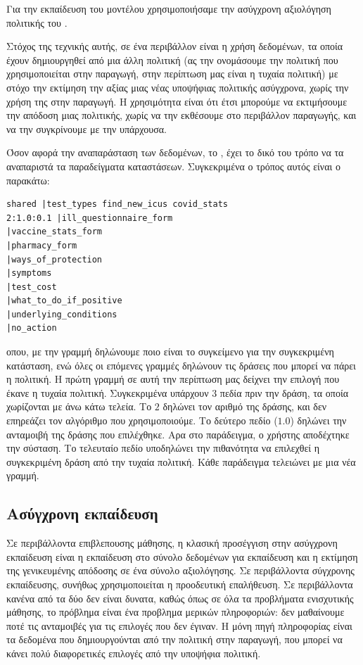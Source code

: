 Για την εκπαίδευση του μοντέλου χρησιμοποιήσαμε την ασύγχρονη αξιολόγηση πολιτικής  του .

Στόχος της τεχνικής αυτής, σε ένα περιβάλλον  είναι η χρήση δεδομένων, τα οποία έχουν δημιουργηθεί από μια άλλη πολιτική (ας την ονομάσουμε την πολιτική που χρησιμοποιείται στην παραγωγή, στην περίπτωση μας είναι η τυχαία πολιτική) με στόχο την εκτίμηση την αξίας μιας νέας υποψήφιας πολιτικής ασύγχρονα, χωρίς την χρήση της στην παραγωγή. Η χρησιμότητα είναι ότι έτσι μπορούμε να εκτιμήσουμε την απόδοση μιας πολιτικής, χωρίς να την εκθέσουμε στο περιβάλλον παραγωγής, και να την συγκρίνουμε με την υπάρχουσα.

Όσον αφορά την αναπαράσταση των δεδομένων, το , έχει το δικό του τρόπο να τα αναπαριστά τα παραδείγματα καταστάσεων. Συγκεκριμένα ο τρόπος αυτός είναι ο παρακάτω:

\begin{otherlanguage}{english}
    \begin{lstlisting}[caption=Μορφή εισόδου \en{Vowpal Wabbit}]
shared |test_types find_new_icus covid_stats
2:1.0:0.1 |ill_questionnaire_form
|vaccine_stats_form
|pharmacy_form
|ways_of_protection
|symptoms
|test_cost
|what_to_do_if_positive
|underlying_conditions
|no_action
    \end{lstlisting}
\end{otherlanguage}

οπου, με την γραμμή  δηλώνουμε ποιο είναι το συγκείμενο για την συγκεκριμένη κατάσταση, ενώ όλες οι επόμενες γραμμές δηλώνουν τις δράσεις που μπορεί να πάρει η πολιτική. Η πρώτη γραμμή σε αυτή την περίπτωση μας δείχνει την επιλογή που έκανε η τυχαία πολιτική. Συγκεκριμένα υπάρχουν 3 πεδία πριν την δράση, τα οποία χωρίζονται με άνω κάτω τελεία. Το $2$ δηλώνει τον αριθμό της δράσης, και δεν επηρεάζει τον αλγόριθμο που χρησιμοποιούμε. Το δεύτερο πεδίο ($1.0$) δηλώνει την ανταμοιβή της δράσης που επιλέχθηκε. Αρα στο παράδειγμα, ο χρήστης αποδέχτηκε την σύσταση. Το τελευταίο πεδίο υποδηλώνει την πιθανότητα να επιλεχθεί η συγκεκριμένη δράση από την τυχαία πολιτική.  Κάθε παράδειγμα τελειώνει με μια νέα γραμμή.

\subsection{Ασύγχρονη εκπαίδευση}

Σε περιβάλλοντα επιβλεπουσης μάθησης, η κλασική προσέγγιση στην ασύγχρονη εκπαίδευση είναι η εκπαίδευση στο σύνολο δεδομένων για εκπαίδευση και η εκτίμηση της γενικευμένης απόδοσης σε ένα σύνολο αξιολόγησης. Σε περιβάλλοντα σύγχρονης εκπαίδευσης, συνήθως χρησιμοποιείται η προοδευτική επαλήθευση. Σε περιβάλλοντα  κανένα από τα δύο δεν είναι δυνατα, καθώς όπως σε όλα τα προβλήματα ενισχυτικής μάθησης, το πρόβλημα είναι ένα προβλημα μερικών πληροφοριών: δεν μαθαίνουμε ποτέ τις ανταμοιβές για τις επιλογές που δεν έγιναν. Η μόνη πηγή πληροφορίας είναι τα δεδομένα	που δημιουργούνται από την πολιτική στην παραγωγή, που μπορεί να κάνει πολύ διαφορετικές επιλογές από την υποψήφια πολιτική.

